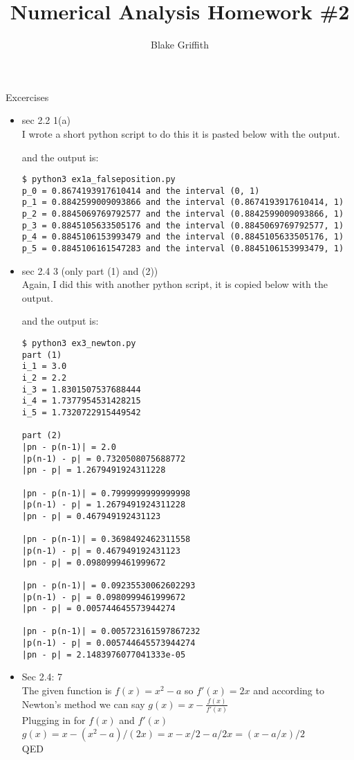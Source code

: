 \documentclass[a4paper]{article}
\title{Numerical Analysis Homework \#2}
\author{Blake Griffith}
\begin{document}
\maketitle
\begin{section}{Excercises}
	\begin{itemize}
		\item{sec 2.2 1(a)}\\
			I wrote a short python script to do this it is pasted below with the output.
			
			and the output is:
			\begin{lstlisting}
$ python3 ex1a_falseposition.py 
p_0 = 0.8674193917610414 and the interval (0, 1)
p_1 = 0.8842599009093866 and the interval (0.8674193917610414, 1)
p_2 = 0.8845069769792577 and the interval (0.8842599009093866, 1)
p_3 = 0.8845105633505176 and the interval (0.8845069769792577, 1)
p_4 = 0.8845106153993479 and the interval (0.8845105633505176, 1)
p_5 = 0.8845106161547283 and the interval (0.8845106153993479, 1)

			\end{lstlisting}

		\item{sec 2.4 3 (only part (1) and (2))}\\
			Again, I did this with another python script, it is copied below with the output.
			
			and the output is:
			\begin{lstlisting}
$ python3 ex3_newton.py 
part (1)
i_1 = 3.0
i_2 = 2.2
i_3 = 1.8301507537688444
i_4 = 1.7377954531428215
i_5 = 1.7320722915449542

part (2)
|pn - p(n-1)| = 2.0
|p(n-1) - p| = 0.7320508075688772
|pn - p| = 1.2679491924311228

|pn - p(n-1)| = 0.7999999999999998
|p(n-1) - p| = 1.2679491924311228
|pn - p| = 0.467949192431123

|pn - p(n-1)| = 0.3698492462311558
|p(n-1) - p| = 0.467949192431123
|pn - p| = 0.0980999461999672

|pn - p(n-1)| = 0.09235530062602293
|p(n-1) - p| = 0.0980999461999672
|pn - p| = 0.005744645573944274

|pn - p(n-1)| = 0.005723161597867232
|p(n-1) - p| = 0.005744645573944274
|pn - p| = 2.1483976077041333e-05
\end{lstlisting}		
\item{Sec 2.4: 7}\\
	The given function is \(f(x) = x^{2} - a \) so \( f'(x) = 2x\) and according to Newton's method we can say \( g(x) = x - \frac{f(x)}{f'(x)}\)\\
	Plugging in for \(f(x)\) and \(f'(x)\)\\
	\( g(x) = x - (x^{2} - a)/(2x) = x - x/2 -a/2x = (x - a/x)/2 \)\\
	QED
	\end{itemize}
\end{section}
\end{document}

